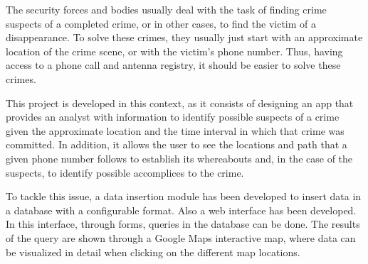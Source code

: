 The security forces and bodies usually deal with the task of finding crime suspects of a completed crime, or in other cases, to find the victim of a disappearance.
To solve these crimes, they usually just start with an approximate location of the crime scene, or with the victim's phone number.
Thus, having access to a phone call and antenna registry, it should be easier to solve these crimes.


This project is developed in this context, as it consists of designing an app that provides an analyst with information to identify possible suspects of a crime given the approximate location and the time interval in which that crime was committed.
In addition, it allows the user to see the locations and path that a given phone number follows to establish its whereabouts and, in the case of the suspects, to identify possible accomplices to the crime.

To tackle this issue, a data insertion module has been developed to insert data in a database with a configurable format. 
Also a web interface has been developed. In this interface, through forms, queries in the database can be done.
The results of the query are shown through a Google Maps interactive map, where data can be visualized in detail when clicking on the different map locations.



